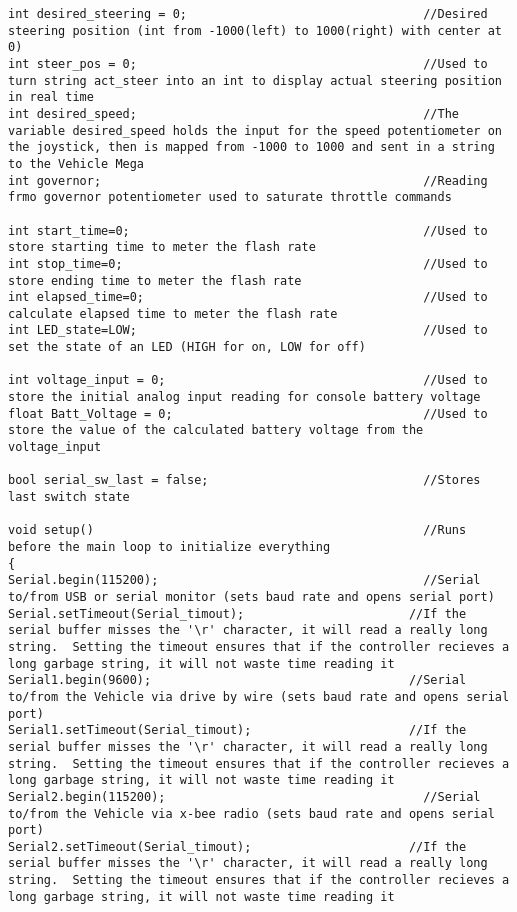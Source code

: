 \begin{lstlisting}[breaklines=true,basicstyle=\tiny]
int desired_steering = 0;                                 //Desired steering position (int from -1000(left) to 1000(right) with center at 0)
int steer_pos = 0;                                        //Used to turn string act_steer into an int to display actual steering position in real time 
int desired_speed;                                        //The variable desired_speed holds the input for the speed potentiometer on the joystick, then is mapped from -1000 to 1000 and sent in a string to the Vehicle Mega
int governor;                                             //Reading frmo governor potentiometer used to saturate throttle commands

int start_time=0;                                         //Used to store starting time to meter the flash rate
int stop_time=0;                                          //Used to store ending time to meter the flash rate
int elapsed_time=0;                                       //Used to calculate elapsed time to meter the flash rate
int LED_state=LOW;                                        //Used to set the state of an LED (HIGH for on, LOW for off)

int voltage_input = 0;                                    //Used to store the initial analog input reading for console battery voltage
float Batt_Voltage = 0;                                   //Used to store the value of the calculated battery voltage from the voltage_input

bool serial_sw_last = false;                              //Stores last switch state

void setup()                                              //Runs before the main loop to initialize everything
{
Serial.begin(115200);                                     //Serial to/from USB or serial monitor (sets baud rate and opens serial port)
Serial.setTimeout(Serial_timout);                       //If the serial buffer misses the '\r' character, it will read a really long string.  Setting the timeout ensures that if the controller recieves a long garbage string, it will not waste time reading it
Serial1.begin(9600);                                    //Serial to/from the Vehicle via drive by wire (sets baud rate and opens serial port)
Serial1.setTimeout(Serial_timout);                      //If the serial buffer misses the '\r' character, it will read a really long string.  Setting the timeout ensures that if the controller recieves a long garbage string, it will not waste time reading it
Serial2.begin(115200);                                    //Serial to/from the Vehicle via x-bee radio (sets baud rate and opens serial port)
Serial2.setTimeout(Serial_timout);                      //If the serial buffer misses the '\r' character, it will read a really long string.  Setting the timeout ensures that if the controller recieves a long garbage string, it will not waste time reading it


\end{lstlisting}
